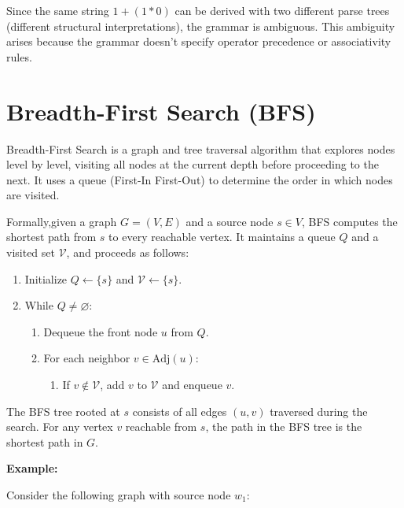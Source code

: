 \documentclass[12pt,a4paper,openany]{article}
\begin{document}
Since the same string $1 + (1 * 0)$ can be derived with two different parse trees (different structural interpretations), the grammar is ambiguous.
This ambiguity arises because the grammar doesn't specify operator precedence or associativity rules.

\section{Breadth-First Search (BFS)}

Breadth-First Search is a graph and tree traversal algorithm that explores
nodes level by level, visiting all nodes at the current depth before proceeding
to the next. It uses a queue (First-In First-Out) to determine the
order in which nodes are visited.

Formally,given a graph $G = (V, E)$ and a source node $s \in V$, BFS computes the
shortest path from $s$ to every reachable vertex. It maintains a queue $Q$ and
a visited set $\mathcal{V}$, and proceeds as follows:

\begin{enumerate}
  \item Initialize $Q \leftarrow \{s\}$ and $\mathcal{V} \leftarrow \{s\}$.
  \item While $Q \neq \varnothing$:
  \begin{enumerate}
    \item Dequeue the front node $u$ from $Q$.
    \item For each neighbor $v \in \text{Adj}(u)$:
    \begin{enumerate}
      \item If $v \notin \mathcal{V}$, add $v$ to $\mathcal{V}$ and enqueue $v$.
    \end{enumerate}
  \end{enumerate}
\end{enumerate}

The BFS tree rooted at $s$ consists of all edges $(u, v)$ traversed
during the search. For any vertex $v$ reachable from $s$, the path in the BFS
tree is the shortest path in $G$.

\textbf{Example:}

Consider the following graph with source node $w_1$:

\begin{center}
\end{center}
\end{document}
